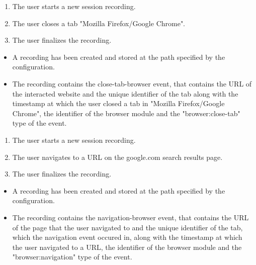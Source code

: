 \begin{tests}
	{\begin{enumerate}
		\item The \gls{user} starts a new \gls{session} recording.
		\item The \gls{user} closes a tab "Mozilla Firefox/Google Chrome".
		\item The \gls{user} finalizes the recording.
	\end{enumerate}}
	{\begin{itemize}
		\item A recording has been created and stored at the path specified by the configuration.
		\item The recording contains the close-tab-browser \gls{event},  that contains the URL of the interacted website and the unique identifier of the tab along with the timestamp at which the \gls{user} closed a tab in "Mozilla Firefox/Google Chrome", the identifier of the \gls{browser} module and the "browser:close-tab" type of the event.
	\end{itemize}}
	
	{\begin{enumerate}
		\item The \gls{user} starts a new \gls{session} recording.
		\item The \gls{user} navigates to a URL on the google.com search results page.
		\item The \gls{user} finalizes the recording.
	\end{enumerate}}
	{\begin{itemize}
		\item A recording has been created and stored at the path specified by the configuration.
		\item The recording contains the navigation-browser \gls{event},  that contains the URL of the page that the \gls{user} navigated to and the unique identifier of the tab, which the navigation \gls{event} occured in, along with the timestamp at which the \gls{user} navigated to a URL, the identifier of the \gls{browser} module and the "browser:navigation" type of the event.
	\end{itemize}}
	

\end{tests}
